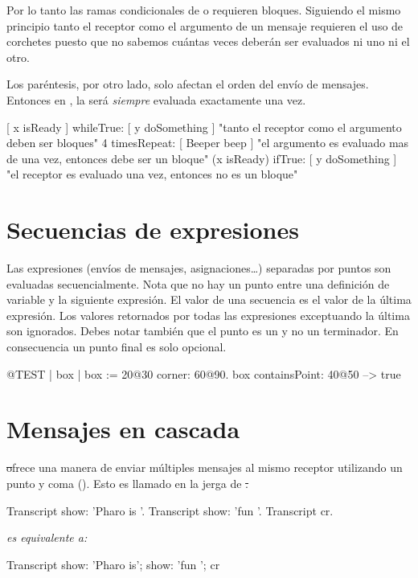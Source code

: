 \documentclass[a4paper,10pt,twoside]{book}
\begin{document}
Por lo tanto las ramas condicionales de  o  requieren bloques. Siguiendo el mismo principio tanto el receptor como el argumento de un mensaje  requieren el uso de corchetes puesto que no sabemos cuántas veces deberán ser evaluados ni uno ni el otro.

Los paréntesis, por otro lado, solo afectan el orden del envío de mensajes.
Entonces en , la  será \emph{siempre} evaluada exactamente una vez.

\begin{code}{}
[ x isReady ] whileTrue: [ y doSomething ]   "tanto el receptor como el argumento deben ser bloques"
4 timesRepeat: [ Beeper beep ]                   "el argumento es evaluado mas de una vez, entonces debe ser un bloque"
(x isReady) ifTrue: [ y doSomething ]           "el receptor es evaluado una vez, entonces no es un bloque"
\end{code}

\section{Secuencias de expresiones}
Las expresiones (\ie envíos de mensajes, asignaciones\dots) separadas por puntos son evaluadas secuencialmente.
Nota que no hay un punto entre una definición de variable y la siguiente expresión.
El valor de una secuencia es el valor de la última expresión. Los valores retornados por todas las expresiones exceptuando la última son ignorados. Debes notar también que el punto es un  y no un terminador. En consecuencia un punto final es solo opcional.

\begin{code}{@TEST}
| box |
box := 20@30 corner: 60@90.
box containsPoint: 40@50 --> true
\end{code}

\section{Mensajes en cascada}
\st ofrece una manera de enviar múltiples mensajes al mismo receptor utilizando un punto y coma (\ct{;}). Esto es llamado  en la jerga de \st.


\begin{minipage}{0.35\textwidth}
\begin{code}{}
Transcript show: 'Pharo is '.
Transcript show: 'fun '.
Transcript cr.
\end{code}
\end{minipage}
\emph{es equivalente a:}
\begin{minipage}{0.35\textwidth}
\begin{code}{}
Transcript        
   show: 'Pharo is';
   show: 'fun ';
   cr
\end{code}
\end{minipage}
\end{document}
